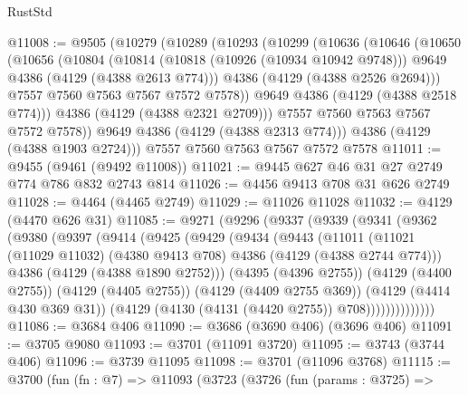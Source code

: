 \begin{lexlean}{RustStd}
\begin{coremodule}
@11008 := @9505
    (@10279
      (@10289
        (@10293
          (@10299
            (@10636
              (@10646
                (@10650
                  (@10656
                    (@10804
                      (@10814
                        (@10818 (@10926 (@10934 @10942 @9748)))
                        @9649
                        @4386
                        (@4129 (@4388 @2613 @774)))
                      @4386
                      (@4129 (@4388 @2526 @2694)))
                    @7557
                    @7560
                    @7563
                    @7567
                    @7572
                    @7578))
                @9649
                @4386
                (@4129 (@4388 @2518 @774)))
              @4386
              (@4129 (@4388 @2321 @2709)))
            @7557
            @7560
            @7563
            @7567
            @7572
            @7578))
        @9649
        @4386
        (@4129 (@4388 @2313 @774)))
      @4386
      (@4129 (@4388 @1903 @2724)))
    @7557
    @7560
    @7563
    @7567
    @7572
    @7578
@11011 := @9455 (@9461 (@9492 @11008))
@11021 := @9445 @627 @46 @31 @27 @2749 @774 @786 @832 @2743 @814
@11026 := @4456 @9413 @708 @31 @626 @2749
@11028 := @4464 (@4465 @2749)
@11029 := @11026 @11028
@11032 := @4129 (@4470 @626 @31)
@11085 := @9271
    (@9296
      (@9337
        (@9339
          (@9341
            (@9362
              (@9380
                (@9397
                  (@9414
                    (@9425
                      (@9429
                        (@9434
                          (@9443
                            (@11011
                              (@11021
                                (@11029 @11032)
                                (@4380 @9413 @708)
                                @4386
                                (@4129 (@4388 @2744 @774)))
                              @4386
                              (@4129 (@4388 @1890 @2752)))
                            (@4395 (@4396 @2755))
                            (@4129 (@4400 @2755))
                            (@4129 (@4405 @2755))
                            (@4129 (@4409 @2755 @369))
                            (@4129 (@4414 @430 @369 @31))
                            (@4129 (@4130 (@4131 (@4420 @2755)) @708))))))))))))))
@11086 := @3684 @406
@11090 := @3686 (@3690 @406) (@3696 @406)
@11091 := @3705 @9080
@11093 := @3701 (@11091 @3720)
@11095 := @3743 (@3744 @406)
@11096 := @3739 @11095
@11098 := @3701 (@11096 @3768)
@11115 := @3700
    (fun (fn : @7) =>
    @11093
      (@3723
        (@3726
          (fun (params : @3725) =>

\end{coremodule}
\end{lexlean}
